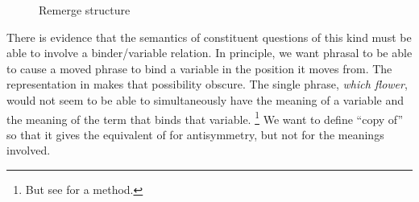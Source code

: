 \documentclass[output=paper]{langsci/langscibook}
\begin{document}
\begin{figure}
\caption{Remerge structure\label{ex:multi1}}
\end{figure}
%

There is evidence that the semantics of constituent questions of this kind must be able to involve a binder/variable relation. In principle, we want phrasal  to be able to cause a moved phrase to bind a variable in the position it moves from. The representation in  makes that possibility obscure. The single phrase, \emph{which flower}, would not seem to be able to simultaneously have the meaning of a variable and the meaning of the term that binds that variable.%
\footnote{But see \textcite{Engdahl1986} for a method.} %
We want to define ``copy of'' so that it gives the equivalent of  for antisymmetry, but not for the meanings involved.
\end{document}
